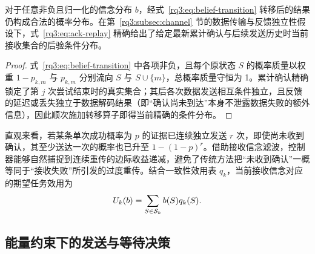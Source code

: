 \begin{proposition}[接收信念的有效性]
\label{rq3:prop:belief}
对于任意非负且归一化的信念分布 $b$，经式~\eqref{rq3:eq:belief-transition} 转移后的结果仍构成合法的概率分布。在第~\ref{rq3:subsec:channel} 节的数据传输与反馈独立性假设下，式~\eqref{rq3:eq:ack-replay} 精确给出了给定最新累计确认与后续发送历史时当前接收集合的后验条件分布。
\end{proposition}

\begin{proof}
式~\eqref{rq3:eq:belief-transition} 中各项非负，且每个原状态 $S$ 的概率质量以权重 $1-p_{k,m}$ 与 $p_{k,m}$ 分别流向 $S$ 与 $S\cup\{m\}$，总概率质量守恒为 1。累计确认精确锁定了第 $j$ 次尝试结束时的真实集合；其后各次数据发送相互条件独立，且反馈的延迟或丢失独立于数据解码结果（即“确认尚未到达”本身不泄露数据失败的额外信息），因此顺次施加转移算子即得当前精确的条件分布。
\end{proof}

直观来看，若某条单次成功概率为 $p$ 的证据已连续独立发送 $r$ 次，即使尚未收到确认，其至少送达一次的概率也已升至 $1-(1-p)^r$。借助接收信念滤波，控制器能够自然捕捉到连续重传的边际收益递减，避免了传统方法把“未收到确认”一概等同于“接收失败”所引发的过度重传。结合一致性效用表 $q_k$，当前接收信念对应的期望任务效用为
\begin{equation}
  U_k(b)=\sum_{S\in\mathcal{S}_k}b(S)q_k(S).
  \label{rq3:eq:expected-utility}
\end{equation}

\subsection{能量约束下的发送与等待决策}
\label{rq3:subsec:queue}
\label{rq3:subsec:decision}
\label{rq3:subsec:complexity}

